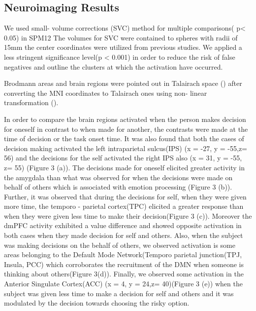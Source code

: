 \documentclass[11pt]{article}
\begin{document}
\subsection{Neuroimaging Results}
We used small- volume corrections (SVC) method for multiple comparisons( p< 0.05) in SPM12 The volumes for SVC were contained to spheres with radii of 15mm the center coordinates were utilized from previous studies. We applied a less stringent significance level(p < 0.001) in order to reduce the risk of false negatives and outline the clusters at which the activation have occurred. 

Brodmann areas and brain regions were pointed out in Talairach space (\citet{talairach1988co})  after converting the MNI coordinates to Talairach ones using non- linear transformation (\citet{lancaster2007bias}). 

In order to compare the brain regions activated when the person makes decision for oneself in contrast to when made for another, the contrasts were made at the time of decision or the task onset time. It was also found that both the cases of decision making activated the left intraparietal sulcus(IPS) (x = -27, y = -55,z= 56) and the decisions for the self activated the right IPS also (x = 31, y = -55, z= 55) (Figure 3 (a)). The decisions made for oneself elicited greater activity in the amygdala than what was observed for when the decisions were made on behalf of others which is associated with emotion processing (Figure 3 (b)). Further, it was observed that during the decisions for self, when they were given more time, the temporo - parietal cortex(TPC) elicited a greater response than when they were given less time to make their decision(Figure 3 (c)). Moreover the dmPFC activity exhibited a value difference and showed opposite activation in both cases when they made decision for self and others. Also, when the subject was making decisions on the behalf of others, we observed activation is some areas belonging to the Default Mode Network(Temporo parietal junction(TPJ, Insula, PCC) which corroborates the recruitment of the DMN when someone is thinking about others(Figure 3(d)). Finally, we observed some activation in the Anterior Singulate Cortex(ACC) (x = 4, y = 24,z= 40)(Figure 3 (e)) when the subject was given less time to make a decision for self and others and it was modulated by the decision towards choosing the risky option.
\end{document}
